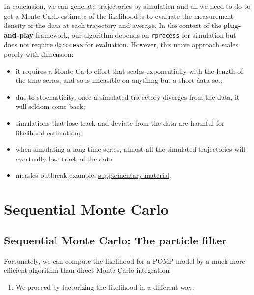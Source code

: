 \documentclass[
  letterpaper,
  DIV=11,
  numbers=noendperiod]{scrartcl}
\providecommand{\tightlist}{%
  \setlength{\itemsep}{0pt}\setlength{\parskip}{0pt}}\usepackage{longtable,booktabs,array}
\begin{document}
\framebreak

In conclusion, we can generate trajectories by simulation and all we
need to do to get a Monte Carlo estimate of the likelihood is to
evaluate the measurement density of the data at each trajectory and
average. In the context of the \textbf{plug-and-play} framework, our
algorithm depends on \texttt{rprocess} for simulation but does not
require \texttt{dprocess} for evaluation. However, this naive approach
scales poorly with dimension:

\begin{itemize}
\item
  it requires a Monte Carlo effort that scales exponentially with the
  length of the time series, and so is infeasible on anything but a
  short data set;
\item
  due to stochasticity, once a simulated trajectory diverges from the
  data, it will seldom come back;
\item
  simulations that lose track and deviate from the data are harmful for
  likelihood estimation;
\item
  when simulating a long time series, almost all the simulated
  trajectories will eventually lose track of the data.
\item
  measles outbreak example: \href{directSimulation.html}{supplementary
  material}.
\end{itemize}

\hypertarget{sequential-monte-carlo}{%
\section{Sequential Monte Carlo}\label{sequential-monte-carlo}}

\hypertarget{sequential-monte-carlo-the-particle-filter}{%
\subsection{Sequential Monte Carlo: The particle
filter}\label{sequential-monte-carlo-the-particle-filter}}

Fortunately, we can compute the likelihood for a POMP model by a much
more efficient algorithm than direct Monte Carlo integration:

\begin{enumerate}
\def\labelenumi{\arabic{enumi}.}
\tightlist
\item
  We proceed by factorizing the likelihood in a different way:
\end{enumerate}
\end{document}
